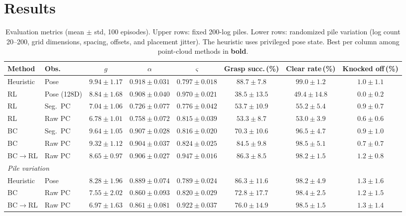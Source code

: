 \documentclass[conference]{IEEEtran}
\begin{document}
\section{Results}
\label{sec:results}
\begin{table}[t]
\centering
\caption{Evaluation metrics (mean $\pm$ std, 100 episodes). Upper rows: fixed 200-log piles. Lower rows: randomized pile variation (log count 20--200, grid dimensions, spacing, offsets, and placement jitter). The heuristic uses privileged pose state. Best per column among point-cloud methods in \textbf{bold}.}
\label{tab:results}
\setlength{\tabcolsep}{5pt}
\begin{tabular}{@{}llcccccc@{}}
\toprule
Method & Obs. & $g$ & $\alpha$ & $\varsigma$ & Grasp succ.\,(\%) & Clear rate\,(\%) & Knocked off\,(\%) \\
\midrule
Heuristic & Pose & $9.94 \pm 1.17$ & $0.918 \pm 0.031$ & $0.797 \pm 0.018$ & $88.7 \pm 7.8$ & $99.0 \pm 1.2$ & $1.0 \pm 1.1$ \\
\addlinespace
RL & Pose (128D) & $8.84 \pm 1.68$ & $0.908 \pm 0.040$ & $0.970 \pm 0.021$ & $38.5 \pm 13.5$ & $49.4 \pm 14.8$ & $0.0 \pm 0.2$ \\
RL & Seg.\ PC   & $7.04 \pm 1.06$ & $0.726 \pm 0.077$ & $0.776 \pm 0.042$ & $53.7 \pm 10.9$ & $55.2 \pm 5.4$ & $0.9 \pm 0.7$ \\
RL & Raw PC     & $6.78 \pm 1.01$ & $0.758 \pm 0.072$ & $0.815 \pm 0.039$ & $53.3 \pm 8.7$ & $53.0 \pm 3.9$ & $\mathbf{0.6 \pm 0.6}$ \\
\addlinespace
BC & Seg.\ PC   & $\mathbf{9.64 \pm 1.05}$ & $\mathbf{0.907 \pm 0.028}$ & $0.816 \pm 0.020$ & $70.3 \pm 10.6$ & $96.5 \pm 4.7$ & $0.9 \pm 1.0$ \\
BC & Raw PC     & $9.32 \pm 1.12$ & $0.904 \pm 0.037$ & $0.824 \pm 0.025$ & $84.5 \pm 9.8$ & $\mathbf{98.5 \pm 5.1}$ & $0.7 \pm 0.7$ \\
\addlinespace
BC$\to$RL & Raw PC & $8.65 \pm 0.97$ & $0.906 \pm 0.027$ & $\mathbf{0.947 \pm 0.016}$ & $\mathbf{86.3 \pm 8.5}$ & $98.2 \pm 1.5$ & $1.2 \pm 0.8$ \\
\midrule
\multicolumn{8}{l}{\textit{Pile variation}} \\
\midrule
Heuristic & Pose   & $8.28 \pm 1.96$ & $0.889 \pm 0.074$ & $0.789 \pm 0.024$ & $86.3 \pm 11.6$ & $98.2 \pm 4.9$ & $1.3 \pm 1.6$ \\
BC        & Raw PC & $7.55 \pm 2.02$ & $0.860 \pm 0.093$ & $0.820 \pm 0.029$ & $72.8 \pm 17.7$ & $98.4 \pm 2.5$ & $1.2 \pm 1.5$ \\
BC$\to$RL & Raw PC & $6.97 \pm 1.63$ & $0.861 \pm 0.081$ & $0.922 \pm 0.037$ & $76.0 \pm 14.9$ & $98.5 \pm 1.5$ & $1.3 \pm 1.4$ \\
\bottomrule
\end{tabular}
\end{table}
\end{document}

